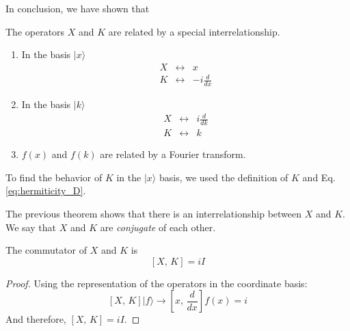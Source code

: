 \documentclass[11pt,fleqn]{book} %
\newcommand{\ket}[1]{| #1\rangle}
\begin{document}
In conclusion, we have shown that
\begin{theorem}
    The operators $X$ and $K$ are related by a special interrelationship.
    \begin{enumerate}
        \item In the basis $\ket{x}$
        \begin{subequations}
            \begin{eqnarray}
                X &\leftrightarrow& x \\
                K &\leftrightarrow& -i\frac{d}{dx}
            \end{eqnarray}
        \end{subequations}
        
        \item In the basis $\ket{k}$
        \begin{subequations}
            \begin{eqnarray}
                X &\leftrightarrow& i\frac{d}{dk} \\
                K &\leftrightarrow& k
            \end{eqnarray}
        \end{subequations}

        \item $f(x)$ and $f(k)$ are related by a Fourier transform.
    \end{enumerate}
\end{theorem}
To find the behavior of $K$ in the $\ket{x}$ basis, we used the definition of $K$ and Eq. \ref{eq:hermiticity_D}.
\begin{remark}
    The previous theorem shows that there is an interrelationship between $X$ and $K$. We say that $X$ and $K$ are \textit{conjugate} of each other.    
\end{remark}

\begin{theorem}
    The commutator of $X$ and $K$ is 
    \begin{equation*}
        \left[X,\,K\right]=iI
    \end{equation*}
\end{theorem}
\begin{proof}
    Using the representation of the operators in the coordinate basis:
    \begin{equation*}
        \left[X,\,K\right]\ket{f} \rightarrow\left[x,\,\frac{d}{dx}\right]f(x) = i
    \end{equation*}
    And therefore, $\left[X,\,K\right]=iI$.
\end{proof}
\end{document}
